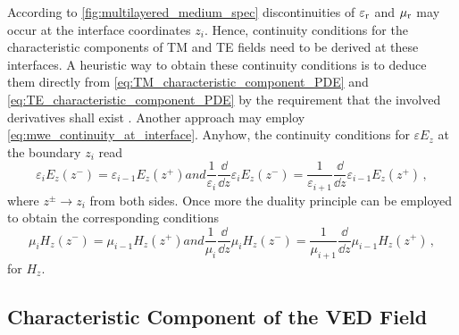 According to \cref{fig:multilayered_medium_spec} discontinuities of $\varepsilon_{\mathrm{r}}$ and
$\mu_{\mathrm{r}}$ may occur at the interface coordinates $z_i$.
Hence, continuity conditions for the characteristic components of \ac{TM} and
\ac{TE} fields need to be derived at these interfaces.
A heuristic way to obtain these continuity conditions is to deduce them directly
from \eqref{eq:TM_characteristic_component_PDE} and
\eqref{eq:TE_characteristic_component_PDE} by the requirement that the
involved derivatives shall exist \cite[47]{Chew1999}.
Another approach may employ \eqref{eq:mwe_continuity_at_interface}.
Anyhow, the continuity conditions for $\varepsilon E_z$ at the boundary
$z_i$ read
\begin{subequations}\label{eq:TM_continuity}
	\begin{equation}\label{eq:TM_continuity_1}
		\varepsilon_i E_{z} \left(z^{-}\right) =
		\varepsilon_{i-1} E_{z} \left(z^{+}\right)
	\end{equation}
	and
	\begin{equation}\label{eq:TM_continuity_2}
		\frac{1}{\varepsilon_i}
		\frac{\dd}{\dd z}
		\varepsilon_i E_{z}\left(z^{-}\right)
		=
		\frac{1}{\varepsilon_{i+1}}
		\frac{\dd}{\dd z}
		\varepsilon_{i-1} E_{z} \left(z^{+}\right)
		\,,
	\end{equation}
\end{subequations}
where $z^{\pm} \to z_i$ from both sides.
Once more the duality principle can be employed to obtain the corresponding
conditions 
\begin{subequations}\label{eq:TE_continuity}
	\begin{equation}\label{eq:TE_continuity_1}
		\mu_i H_{z} \left(z^{-}\right) =
		\mu_{i-1} H_{z} \left(z^{+}\right)
	\end{equation}
	and
	\begin{equation}\label{eq:TE_continuity_2}
		\frac{1}{\mu_i}
		\frac{\dd}{\dd z}
		\mu_i H_{z}\left(z^{-}\right)
		=
		\frac{1}{\mu_{i+1}}
		\frac{\dd}{\dd z}
		\mu_{i-1} H_{z} \left(z^{+}\right)
		\,,
	\end{equation}
\end{subequations}
for $H_z$.








\subsection{Characteristic Component of the \ac{VED} Field}
\label{subsec:E_z_comp_of_VED}

